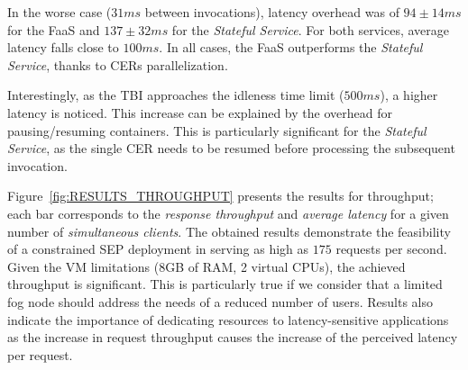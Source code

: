 In the worse case ($31ms$ between invocations), latency overhead was of $94\pm14ms$ for the FaaS and $137\pm32ms$ for the \textit{Stateful Service}. For both services, average latency falls close to $100ms$. In all cases, the FaaS outperforms the \textit{Stateful Service}, thanks to CERs parallelization.

Interestingly, as the TBI approaches the idleness time limit ($500ms$), a higher latency is noticed. This increase can be explained by the overhead for pausing/resuming containers. This is particularly significant for the \textit{Stateful Service}, as the single CER needs to be resumed before processing the subsequent invocation. 


Figure~\ref{fig:RESULTS_THROUGHPUT} presents the results for throughput; each bar corresponds to the \textit{response throughput} and \textit{average latency} for a given number of \textit{simultaneous clients}. 
%
The obtained results demonstrate the feasibility of a constrained SEP deployment in serving as high as $175$ requests per second. Given the VM limitations 
(8GB of RAM, 2 virtual CPUs), the achieved throughput is significant. This is particularly true if we consider that a limited fog node should address the needs of a reduced number of users. Results also indicate the importance of dedicating resources to latency-sensitive applications as the increase in request throughput causes the increase of the perceived latency per request. 





